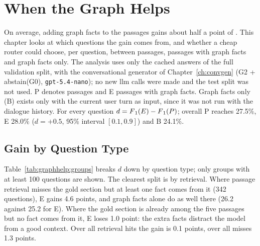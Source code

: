 
\chapter{When the Graph Helps}\label{ch:graphhelp}

On average, adding graph facts to the passages gains about half a point of \fone{}. This
chapter looks at which questions the gain comes from, and whether a cheap router could
choose, per question, between passages, passages with graph facts and graph facts only.
The analysis uses only the cached answers of the full validation split, with the
conversational generator of Chapter~\ref{ch:convgen} (G2 + abstain(G0), \texttt{gpt-5.4-nano});
no new \gls{llm} calls were made and the test split was not used. P denotes passages and E
passages with graph facts. Graph facts only (B) exists only with the current user turn as
input, since it was not run with the dialogue history. For every question
$d = F\textsubscript{1}{}(E) - F\textsubscript{1}{}(P)$; overall P reaches 27.5\%, E 28.0\% ($d = +0.5$, 95\%
interval $[0.1, 0.9]$) and B 24.1\%.


\section{Gain by Question Type}\label{sec:graphhelp:groups}

Table~\ref{tab:graphhelp:groups} breaks $d$ down by question type; only groups with at
least 100 questions are shown. The clearest split is by retrieval. Where passage retrieval
misses the gold section but at least one fact comes from it (342 questions), E gains 4.6
points, and graph facts alone do as well there (26.2 against 25.2 for E). Where the gold
section is already among the five passages but no fact comes from it, E loses 1.0 point:
the extra facts distract the model from a good context. Over all retrieval hits the gain
is 0.1 points, over all misses 1.3 points.

